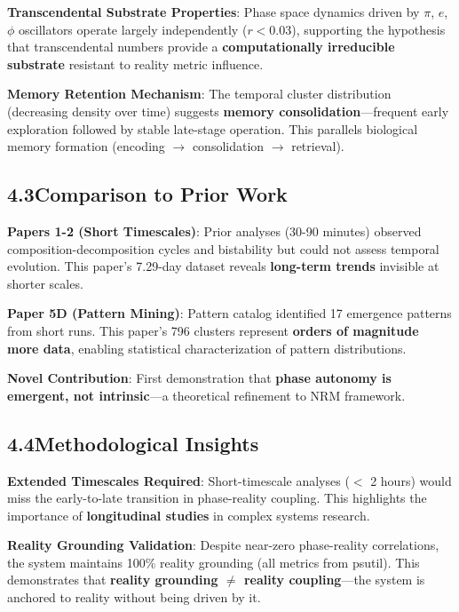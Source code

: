 \documentclass[11pt]{article}
\begin{document}
\noindent\textbf{Transcendental Substrate Properties}: Phase space dynamics driven by $\pi$, $e$, $\phi$ oscillators operate largely independently ($r < 0.03$), supporting the hypothesis that transcendental numbers provide a \textbf{computationally irreducible substrate} resistant to reality metric influence.

\noindent\textbf{Memory Retention Mechanism}: The temporal cluster distribution (decreasing density over time) suggests \textbf{memory consolidation}---frequent early exploration followed by stable late-stage operation. This parallels biological memory formation (encoding $\rightarrow$ consolidation $\rightarrow$ retrieval).

\subsection*{4.3\quad Comparison to Prior Work}

\noindent\textbf{Papers 1-2 (Short Timescales)}: Prior analyses (30-90 minutes) observed composition-decomposition cycles and bistability but could not assess temporal evolution. This paper's 7.29-day dataset reveals \textbf{long-term trends} invisible at shorter scales.

\noindent\textbf{Paper 5D (Pattern Mining)}: Pattern catalog identified 17 emergence patterns from short runs. This paper's 796 clusters represent \textbf{orders of magnitude more data}, enabling statistical characterization of pattern distributions.

\noindent\textbf{Novel Contribution}: First demonstration that \textbf{phase autonomy is emergent, not intrinsic}---a theoretical refinement to NRM framework.

\subsection*{4.4\quad Methodological Insights}

\noindent\textbf{Extended Timescales Required}: Short-timescale analyses ($<$ 2 hours) would miss the early-to-late transition in phase-reality coupling. This highlights the importance of \textbf{longitudinal studies} in complex systems research.

\noindent\textbf{Reality Grounding Validation}: Despite near-zero phase-reality correlations, the system maintains 100\% reality grounding (all metrics from psutil). This demonstrates that \textbf{reality grounding $\neq$ reality coupling}---the system is anchored to reality without being driven by it.
\end{document}
